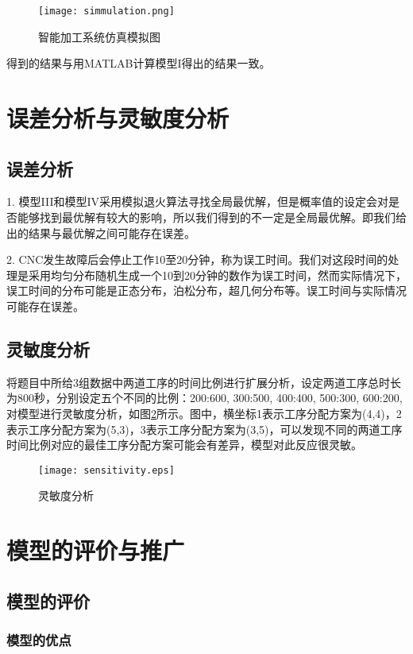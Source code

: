 \documentclass[no-math,withoutpreface,bwprint]{cumcmthesis} %
\numberwithin{equation}{section}
\numberwithin{figure}{section}
\numberwithin{table}{section}
\begin{document}
\begin{figure}[!htbp]
	\centering
	\texttt{[image: simmulation.png]}
	\caption{智能加工系统仿真模拟图}
     \label{figsim}
\end{figure}

得到的结果与用MATLAB计算模型I得出的结果一致。

\section{误差分析与灵敏度分析}
\subsection{误差分析}

1. 模型III和模型IV采用模拟退火算法寻找全局最优解，但是概率值的设定会对是否能够找到最优解有较大的影响，所以我们得到的不一定是全局最优解。即我们给出的结果与最优解之间可能存在误差。

2. CNC发生故障后会停止工作10至20分钟，称为误工时间。我们对这段时间的处理是采用均匀分布随机生成一个10到20分钟的数作为误工时间，然而实际情况下，误工时间的分布可能是正态分布，泊松分布，超几何分布等。误工时间与实际情况可能存在误差。

\subsection{灵敏度分析}

将题目中所给3组数据中两道工序的时间比例进行扩展分析，设定两道工序总时长为800秒，分别设定五个不同的比例：200:600, 300:500, 400:400, 500:300, 600:200, 对模型进行灵敏度分析，如图\ref{figsen}所示。图中，横坐标1表示工序分配方案为(4,4)，2表示工序分配方案为(5,3)，3表示工序分配方案为(3,5)，可以发现不同的两道工序时间比例对应的最佳工序分配方案可能会有差异，模型对此反应很灵敏。
\begin{figure}[!htbp]
	\centering
	\texttt{[image: sensitivity.eps]}
	\caption{灵敏度分析}
     \label{figsen}
\end{figure}

\section{模型的评价与推广}
\subsection{模型的评价}
\subsubsection{模型的优点}
\end{document}
